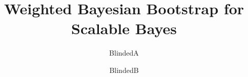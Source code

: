 \documentclass[12pt]{TD-CJS}
\begin{document}



\newtheorem{theorem}{Theorem}
\newtheorem{fact}{Fact}
\newtheorem{example}{Example}
\newtheorem{acknowledgement}[theorem]{Acknowledgement}
\newtheorem{algorithm}[theorem]{Algorithm}
\newtheorem{axiom}[theorem]{Axiom}
\newtheorem{case}[theorem]{Case}
\newtheorem{claim}[theorem]{Claim}
\newtheorem{conclusion}[theorem]{Conclusion}
\newtheorem{condition}[theorem]{Condition}
\newtheorem{conjecture}[theorem]{Conjecture}
\newtheorem{corollary}[theorem]{Corollary}
\newtheorem{criterion}[theorem]{Criterion}
\newtheorem{definition}[theorem]{Definition}

\newtheorem{exercise}[theorem]{Exercise}
\newtheorem{lemma}[theorem]{Lemma}
\newtheorem{notation}[theorem]{Notation}
\newtheorem{problem}[theorem]{Problem}
\newtheorem{proposition}[theorem]{Proposition}
\newtheorem{remark}[theorem]{Remark}
\newtheorem{solution}[theorem]{Solution}
\newtheorem{summary}[theorem]{Summary}


\newcommand{\what}[1][j]{\hat\omega_{#1}^{-1(g)}}
\newcommand{\bX}{\bf{X}}
\newcommand{\Oi}{\Omega^{(g)}}
\newcommand{\bone}{\bf{1}}
\def\E{\qopname\relax o{E}}
\newcommand{\diag}{diag}
\newcommand{\PG}{ \mathcal{PG}}
\newcommand{\Ga}{ \mathcal{G} }
\newcommand{\N}{ \mathcal{N} }
\newcommand{\DE}{ \mathcal{DE} }
\newcommand{\Ex}{ \mathcal{E} }
\newcommand{\prox}{ \mathop{\mathrm{prox}} }
\newcommand{\R}{\mathcal{R}}
\newcommand{\Rbar}{ \overline{\R} }
\newcommand{\sgn}{\mathop{\mathrm{sgn}}}
\newcommand{\dd}{\mathrm{d}}

\newcommand{\vnorm}[1]{\left|\left|#1\right|\right|}
\newcommand{\enorm}[1]{\Vert #1 \Vert_2}

\newcommand{\bx}{{\bf x}}
\newcommand{\by}{{\bf y}}
\newcommand{\bs}{{\bf s}}
\newcommand{\bm}{{\bf m}}
\newcommand{\bu}{{\bf u}}
\newcommand{\bv}{{\bf v}}
\newcommand{\defeq}{\mathrel{\mathop:}=}
\newcommand{\eqdist}{\stackrel{D}{=}}

\title[]{Weighted Bayesian Bootstrap for Scalable Bayes}

\author{BlindedA\thanksref{*}}
\author{BlindedB}
\end{document}
